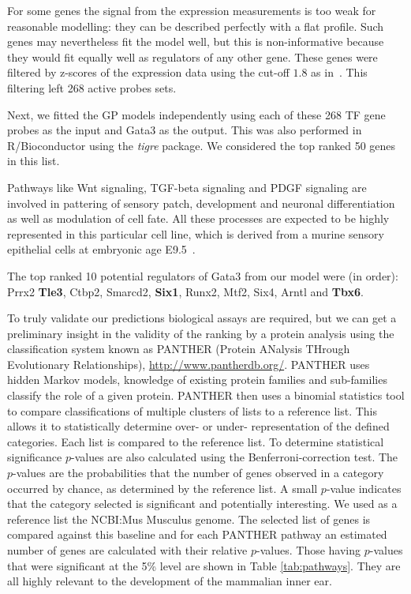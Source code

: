 \documentclass{article}
\begin{document}
For some genes the signal from the expression measurements is too weak
for reasonable modelling: they can  be described perfectly with a flat
profile.  Such genes may nevertheless  fit the model well, but this is
non-informative because  they would fit equally well  as regulators of
any  other  gene.   These  genes  were filtered  by  z-scores  of  the
expression      data     using      the      cut-off     $1.8$      as
in~\cite{Honkela:modelbased10}.  This filtering left 268 active probes
sets.

Next, we fitted the GP models independently using each of these 268 TF
gene  probes as  the input  and Gata3  as the  output.  This  was also
performed in R/Bioconductor using the \emph{tigre} package. We considered the top ranked 50 genes in this list. 

Pathways like Wnt signaling, TGF-beta signaling and PDGF signaling are
involved  in  pattering of  sensory  patch,  development and  neuronal
differentiation  as  well  as  modulation  of  cell  fate.  All  these
processes  are expected to  be highly  represented in  this particular
cell line, which is derived  from a murine sensory epithelial cells at
embryonic age E9.5~\cite{Milo2009}.


The top ranked 10 potential regulators of Gata3 from our model were
(in order): Prrx2 \textbf{Tle3}, Ctbp2, Smarcd2, \textbf{Six1}, Runx2,
Mtf2, Six4, Arntl and \textbf{Tbx6}.

To truly validate our  predictions biological assays are required, but
we can get  a preliminary insight in the validity of  the ranking by a
protein  analysis using  the  classification system  known as  PANTHER
(Protein     ANalysis     THrough     Evolutionary     Relationships),
\url{http://www.pantherdb.org/}.   PANTHER uses hidden  Markov models,
knowledge of  existing protein families and  sub-families classify the
role of a given protein.  PANTHER then uses a binomial statistics tool
to  compare  classifications  of  multiple  clusters  of  lists  to  a
reference  list. This allows  it to  statistically determine  over- or
under- representation of the defined categories. Each list is compared
to   the  reference  list.   To  determine   statistical  significance
$p$-values  are   also  calculated  using   the  Benferroni-correction
test. The  $p$-values are the  probabilities that the number  of genes
observed  in a  category  occurred  by chance,  as  determined by  the
reference list. A small $p$-value indicates that the category selected
is significant  and potentially interesting.   We used as  a reference
list  the NCBI:Mus  Musculus genome.  The  selected list  of genes  is
compared  against  this  baseline  and  for each  PANTHER  pathway  an
estimated  number   of  genes  are  calculated   with  their  relative
$p$-values. Those  having $p$-values that were significant  at the 5\%
level  are shown  in  Table \ref{tab:pathways}.  They  are all  highly
relevant to the development of the mammalian inner ear.
\end{document}
